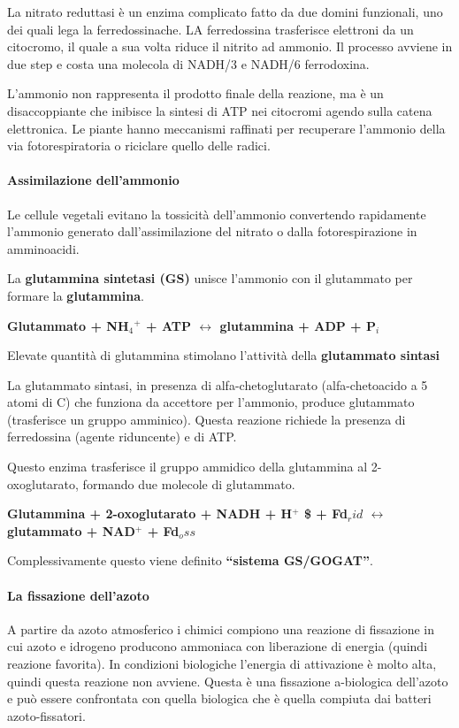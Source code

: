 \documentclass[]{article}
\begin{document}
La nitrato reduttasi è un enzima complicato fatto da due domini
funzionali, uno dei quali lega la ferredossinache. LA ferredossina
trasferisce elettroni da un citocromo, il quale a sua volta riduce il
nitrito ad ammonio. Il processo avviene in due step e costa una molecola
di NADH/3 e NADH/6 ferrodoxina.

L'ammonio non rappresenta il prodotto finale della reazione, ma è un
disaccoppiante che inibisce la sintesi di ATP nei citocromi agendo sulla
catena elettronica. Le piante hanno meccanismi raffinati per recuperare
l'ammonio della via fotorespiratoria o riciclare quello delle radici.

\paragraph{Assimilazione dell'ammonio}\label{assimilazione-dellammonio}

Le cellule vegetali evitano la tossicità dell'ammonio convertendo
rapidamente l'ammonio generato dall'assimilazione del nitrato o dalla
fotorespirazione in amminoacidi.

La \textbf{glutammina sintetasi (GS)} unisce l'ammonio con il glutammato
per formare la \textbf{glutammina}.

\textbf{Glutammato + NH$_4$$^+$ + ATP $\longleftrightarrow$ glutammina +
ADP + P$_i$}

Elevate quantità di glutammina stimolano l'attività della
\textbf{glutammato sintasi}

La glutammato sintasi, in presenza di alfa-chetoglutarato
(alfa-chetoacido a 5 atomi di C) che funziona da accettore per
l'ammonio, produce glutammato (trasferisce un gruppo amminico). Questa
reazione richiede la presenza di ferredossina (agente riduncente) e di
ATP.

Questo enzima trasferisce il gruppo ammidico della glutammina al
2-oxoglutarato, formando due molecole di glutammato.

\textbf{Glutammina + 2-oxoglutarato + NADH + H$^+$ \$ + Fd$_rid$
$\longleftrightarrow$ glutammato + NAD$^+$ + Fd$_oss$}

Complessivamente questo viene definito \textbf{``sistema GS/GOGAT''}.

\paragraph{La fissazione dell'azoto}\label{la-fissazione-dellazoto}

A partire da azoto atmosferico i chimici compiono una reazione di
fissazione in cui azoto e idrogeno producono ammoniaca con liberazione
di energia (quindi reazione favorita). In condizioni biologiche
l'energia di attivazione è molto alta, quindi questa reazione non
avviene. Questa è una fissazione a-biologica dell'azoto e può essere
confrontata con quella biologica che è quella compiuta dai batteri
azoto-fissatori.
\end{document}
